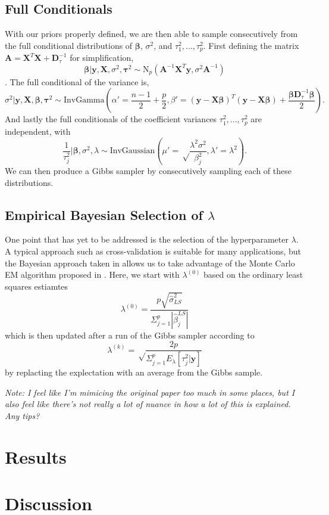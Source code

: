 \documentclass{uwstat572}
\begin{document}
\subsection{Full Conditionals}
With our priors properly defined, we are then able to sample consecutively from the full conditional distributions of $\boldsymbol\beta$, $\sigma^2$, and $\tau^2_1,...,\tau^2_p$. First defining the matrix $\mathbf{A}=\mathbf{X}^T\mathbf{X}+\mathbf{D}_\tau^{-1}$ for simplification, \[
\boldsymbol\beta|\mathbf{y},\mathbf{X},\sigma^2,\boldsymbol\tau^2 \sim \text{N}_p(\mathbf{A}^{-1}\mathbf{X}^T\mathbf{y},\sigma^2\mathbf{A}^{-1}) \]. The full conditional of the variance is, \[ \sigma^2|\mathbf{y},\mathbf{X},\boldsymbol\beta,\boldsymbol\tau^2 \sim \text{InvGamma}\left(\alpha'=\frac{n-1}{2}+\frac{p}{2},\beta'=(\mathbf{y}-\mathbf{X}\boldsymbol\beta)^T(\mathbf{y}-\mathbf{X}\boldsymbol\beta)+\frac{\boldsymbol\beta\mathbf{D}_\tau^{-1}\boldsymbol\beta}{2}\right). \] And lastly the full conditionals of the coefficient variances $\tau^2_1,...,\tau^2_p$ are independent, with \[
\frac{1}{\tau_j^2} | \boldsymbol\beta, \sigma^2, \lambda \sim \text{InvGaussian}\left(\mu'=\sqrt\frac{\lambda^2\sigma^2}{\beta_j^2}, \lambda'=\lambda^2\right). \] We can then produce a Gibbs sampler by consecutively sampling each of these distributions.

\subsection{Empirical Bayesian Selection of $\lambda$}
One point that has yet to be addressed is the selection of the hyperparameter $\lambda$. A typical approach such as cross-validation is suitable for many applications, but the Bayesian approach taken in \cite{park2008bayesian} allows us to take advantage of the Monte Carlo EM algorithm proposed in \cite{casella2001empirical}. Here, we start with $\lambda^{(0)}$ based on the ordinary least squares estiamtes \[ 
\lambda^{(0)}=\frac{p\sqrt{\hat\sigma^2_{LS}}}{\Sigma^p_{j=1}|\hat\beta_j^{LS}|} 
\] which is then updated after a run of the Gibbs sampler according to \[ 
\lambda^{(k)}=\sqrt\frac{2p}{\Sigma^p_{j=1}E_\lambda[\tau^2_j|\mathbf{y}]}
\] by replacting the explectation with an average from the Gibbs sample. 

\emph{Note: I feel like I'm mimicing the original paper too much in some places, but I also feel like there's not really a lot of nuance in how a lot of this is explained. Any tips?}

\section{Results}

\section{Discussion}


\end{document}
